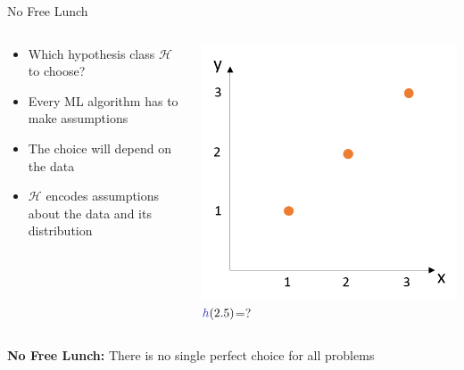 \documentclass[aspectratio=169,10pt]{beamer}
\begin{document}
\begin{frame}{No Free Lunch}
	\begin{columns}
		\begin{column}{0.6\linewidth}
			\begin{itemize}
				\item Which hypothesis class $\mathcal{H}$ to choose?
				\item Every ML algorithm has to make assumptions
				\item The choice will depend on the data
				\item $\mathcal{H}$ encodes assumptions about the data and its distribution
			
			\end{itemize}
		\end{column}
	\begin{column}{0.4\linewidth}
		\centering
		\includegraphics[width=0.8\linewidth, clip]{images/no_free}
		$\hypothesis(2.5)$=?
	\end{column}
	\end{columns}
\vspace{0.4cm}
\centering
	\textbf{No Free Lunch:} There is no single perfect choice for all problems
\end{frame}
\end{document}
